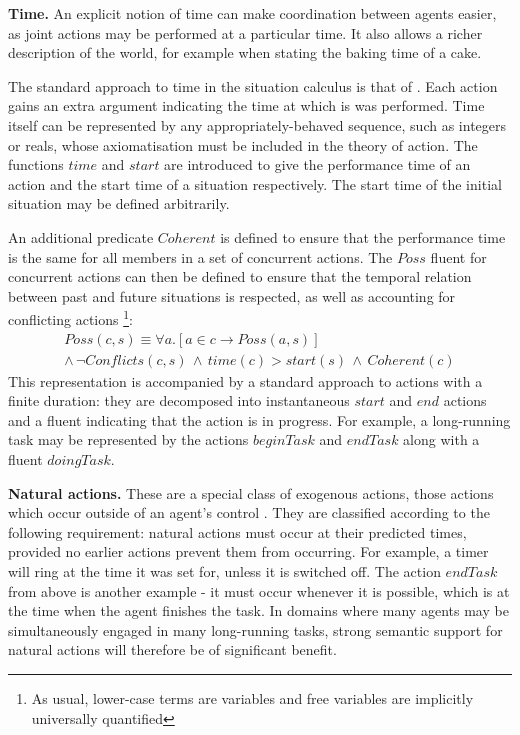 \documentclass[times, 10pt, twocolumn]{article}
\begin{document}
\textbf{Time.} An explicit notion of time can make coordination
between agents easier, as joint actions may be performed at a particular
time. It also allows a richer description of the world, for example
when stating the baking time of a cake.

The standard approach to time in the situation calculus is that of
\cite{reiter96sc_nat_conc,pinto94temporal}. Each action gains an
extra argument indicating the time at which is was performed. Time
itself can be represented by any appropriately-behaved sequence, such
as integers or reals, whose axiomatisation must be included in the
theory of action. The functions $time$ and $start$ are introduced
to give the performance time of an action and the start time of a
situation respectively. The start time of the initial situation may
be defined arbitrarily.

An additional predicate $Coherent$ is defined to ensure that the
performance time is the same for all members in a set of concurrent
actions. The $Poss$ fluent for concurrent actions can then be defined
to ensure that the temporal relation between past and future situations
is respected, as well as accounting for conflicting actions%
\footnote{As usual, lower-case terms are variables and free variables are implicitly
universally quantified%
}:\begin{multline*}
Poss(c,s)\equiv\forall a.\left[a\in c\rightarrow Poss(a,s)\right]\\
\wedge\,\neg Conflicts(c,s)\,\wedge\, time(c)>start(s)\,\wedge\, Coherent(c)\end{multline*}
 This representation is accompanied by a standard approach to actions
with a finite duration: they are decomposed into instantaneous $start$
and $end$ actions and a fluent indicating that the action is in progress.
For example, a long-running task may be represented by the actions
$beginTask$ and $endTask$ along with a fluent $doingTask$.

\textbf{Natural actions.} These are a special class of exogenous
actions, those actions which occur outside of an agent's control \cite{reiter96sc_nat_conc}.
They are classified according to the following requirement: natural
actions must occur at their predicted times, provided no earlier actions
prevent them from occurring. For example, a timer will ring at the
time it was set for, unless it is switched off. The action $endTask$
from above is another example - it must occur whenever it is possible,
which is at the time when the agent finishes the task. In domains
where many agents may be simultaneously engaged in many long-running
tasks, strong semantic support for natural actions will therefore
be of significant benefit.
\end{document}
